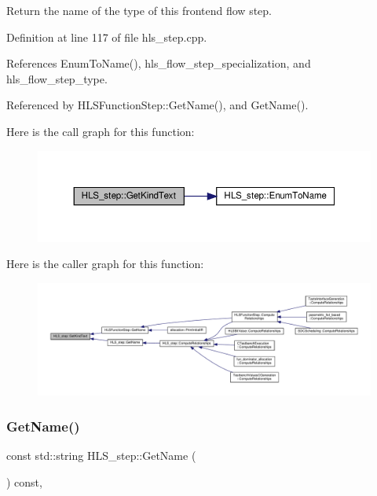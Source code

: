Return the name of the type of this frontend flow step. 



Definition at line 117 of file hls\+\_\+step.\+cpp.



References Enum\+To\+Name(), hls\+\_\+flow\+\_\+step\+\_\+specialization, and hls\+\_\+flow\+\_\+step\+\_\+type.



Referenced by H\+L\+S\+Function\+Step\+::\+Get\+Name(), and Get\+Name().

Here is the call graph for this function\+:
\nopagebreak
\begin{figure}[H]
\begin{center}
\leavevmode
\includegraphics[width=350pt]{da/d27/classHLS__step_a1b5fed780e5f785be6405a8fbeaa093d_cgraph}
\end{center}
\end{figure}
Here is the caller graph for this function\+:
\nopagebreak
\begin{figure}[H]
\begin{center}
\leavevmode
\includegraphics[width=350pt]{da/d27/classHLS__step_a1b5fed780e5f785be6405a8fbeaa093d_icgraph}
\end{center}
\end{figure}
\mbox{\label{classHLS__step_aa60ee88fc2b3b180e118e8dee44f4044}} 
\subsubsection{\texorpdfstring{Get\+Name()}{GetName()}}
{\footnotesize\ttfamily const std\+::string H\+L\+S\+\_\+step\+::\+Get\+Name (\begin{DoxyParamCaption}{ }\end{DoxyParamCaption}) const\hspace{0.3cm}{\ttfamily [override]}, {\ttfamily [virtual]}}



